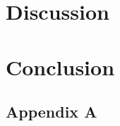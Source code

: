 \documentclass[11pt,twoside,titlepage]{report}
\begin{document}
\chapter{Discussion}


\chapter{Conclusion}



\clearpage{\pagestyle{empty}\cleardoublepage}
 \label{bibtex}

\label{appendices}
\clearpage{\pagestyle{empty}\cleardoublepage}
\begin{appendices}
    \chapter{Appendix A}
    
    


\end{appendices}
\newpage
\listoftodos[Notes]
\end{document}
